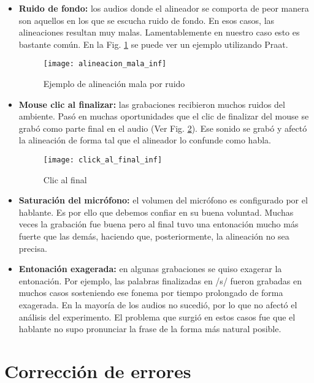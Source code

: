 \begin{itemize}
    \item \textbf{Ruido de fondo:} los audios donde el alineador se comporta de peor manera son aquellos en los que se escucha ruido de fondo. En esos casos, las alineaciones resultan muy malas. Lamentablemente en nuestro caso esto es bastante común. En la Fig. \ref{alinMala} se puede ver un ejemplo utilizando Praat.

\begin{figure}[h!]
    \centerline{\texttt{[image: alineacion\_mala\_inf]} }
    \caption{Ejemplo de alineación mala por ruido}
    \label{alinMala}
\end{figure}

    \item \textbf{Mouse clic al finalizar:} las grabaciones recibieron muchos ruidos del ambiente. Pasó en muchas oportunidades que el clic de finalizar del mouse se grabó como parte final en el audio (Ver Fig. \ref{clickFinal}). Ese sonido se grabó y afectó la alineación de forma tal que el alineador lo confunde como habla.
    
\begin{figure}[h!]
    \centerline{\texttt{[image: click\_al\_final\_inf]} }
    \caption{Clic al final}
    \label{clickFinal}
\end{figure}

    \item \textbf{Saturación del micrófono:} el volumen del micrófono es configurado por el hablante. Es por ello que debemos confiar en su buena voluntad. Muchas veces la grabación fue buena pero al final tuvo una entonación mucho más fuerte que las demás, haciendo que, posteriormente, la alineación no sea precisa.

    \item \textbf{Entonación exagerada:} en algunas grabaciones se quiso exagerar la entonación. Por ejemplo, las palabras finalizadas en /s/ fueron grabadas en muchos casos sosteniendo ese fonema por tiempo prolongado de forma exagerada. En la mayoría de los audios no sucedió, por lo que no afectó el análisis del experimento. El problema que surgió en estos casos fue que el hablante no supo pronunciar la frase de la forma más natural posible. 
    
\end{itemize}

\section{Corrección de errores}

